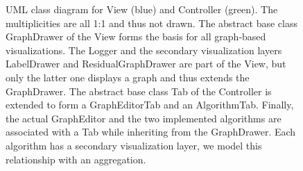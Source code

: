 \begin{figure}[htb!]
\caption{UML class diagram for View (blue) and Controller (green). The multiplicities are all 1:1 and thus not drawn. The abstract base class GraphDrawer of the View forms the basis for all graph-based visualizations. The Logger and the secondary visualization layers LabelDrawer and ResidualGraphDrawer are part of the View, but only the latter one displays a graph and thus extends the GraphDrawer. The abstract base class Tab of the Controller is extended to form a GraphEditorTab and an AlgorithmTab. Finally, the actual GraphEditor and the two implemented algorithms are associated with a Tab while inheriting from the GraphDrawer. Each algorithm has a secondary visualization layer, we model this relationship with an aggregation.}
\label{fig:viewcontroller}
\end{figure}



